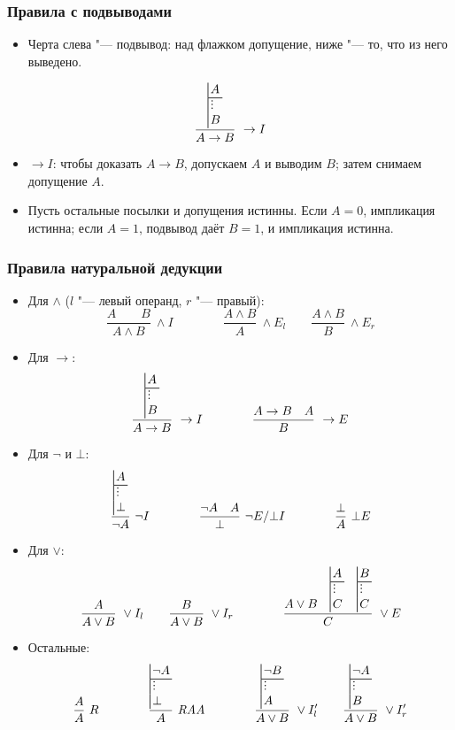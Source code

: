 \documentclass[10pt]{beamer}
\begin{document}
\begin{frame}
    \frametitle{Правила с подвыводами}
    \begin{itemize}
        \item Черта слева "--- подвывод: над флажком допущение, ниже "--- то, что из него выведено.
    \end{itemize}
    \[
        \frac{\ndsubproof{A}{B}}{A\to B}\ \to I
    \]
    \begin{itemize}
        \item<2-> $\to I$: чтобы доказать $A\to B$, допускаем $A$ и выводим $B$; затем снимаем допущение $A$.
        \item<2-> Пусть остальные посылки и допущения истинны. Если $A=0$, импликация истинна; если $A=1$, подвывод даёт $B=1$, и импликация истинна.
    \end{itemize}
\end{frame}

\begin{frame}
    \frametitle{Правила натуральной дедукции}
    \scriptsize
    \setlength{\abovedisplayskip}{2pt}
    \setlength{\belowdisplayskip}{2pt}
    \setlength{\abovedisplayshortskip}{0pt}
    \setlength{\belowdisplayshortskip}{2pt}
    \begin{itemize}
        \item Для $\land$ ($l$ "--- левый операнд, $r$ "--- правый):
        \[ 
        \frac{A \qquad B}{A \wedge B}\ \wedge I 
        \qquad \qquad 
        \frac{A \wedge B}{A}\ \wedge E_l
        \qquad
        \frac{A \wedge B}{B}\ \wedge E_r
        \]
        \item Для $\to$:
        \[ 
        \frac{\ndsubproof{A}{B}}{A \to B}\ \to I
        \qquad \qquad 
        \frac{A \to B \quad A}{B}\ \to E
        \]
        \item Для $\neg$ и $\bot$:
        \[
        \frac{\ndsubproof{A}{\bot}}{\neg A}\ \neg I
        \qquad \qquad 
        \frac{\neg A \quad A}{\bot}\ \neg E/\bot I
        \qquad \qquad 
        \frac{\bot}{A}\ \bot{E}
        \]
        \item Для $\lor$:
        \[
        \frac{A}{A \lor B}\ \lor I_l
        \qquad
        \frac{B}{A \lor B}\ \lor I_r
        \qquad \qquad 
        \frac{A \lor B \quad \ndsubproof{A}{C} \quad \ndsubproof{B}{C}}{C}\ \lor E
        \]
        \item Остальные:
        \[
        \frac{A}{A}\ R
        \qquad \qquad
        \frac{\ndsubproof{\neg A}{\bot}}{A}\ \RAA
        \qquad \qquad
        \frac{\ndsubproof{\neg B}{A}}{A \lor B}\ \lor I'_l
        \qquad
        \frac{\ndsubproof{\neg A}{B}}{A \lor B}\ \lor I'_r
        \]
    \end{itemize}
\end{frame}
\end{document}
